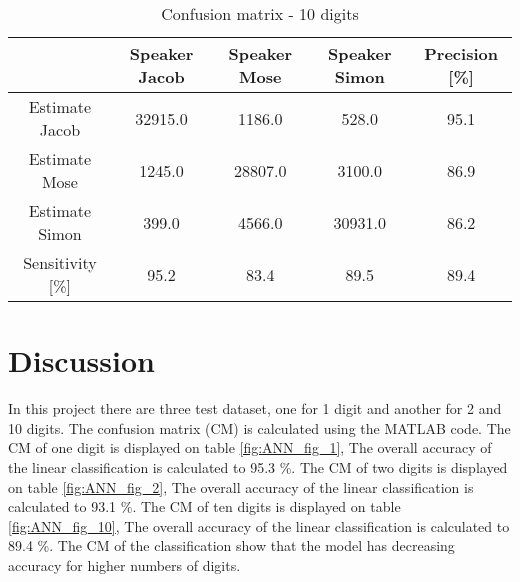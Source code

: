\begin{table}[H]                                                    
\centering                                                          
\begin{tabular}{|c|c|c|c|c|}                                        
\hline                                                              
  & Speaker Jacob & Speaker Mose & Speaker Simon & Precision [\%] \\
\hline                                                              
Estimate Jacob & 32915.0 & 1186.0 & 528.0 & 95.1 \\                 
\hline                                                              
Estimate Mose & 1245.0 & 28807.0 & 3100.0 & 86.9 \\                 
\hline                                                              
Estimate Simon & 399.0 & 4566.0 & 30931.0 & 86.2 \\                 
\hline                                                              
Sensitivity [\%] & 95.2 & 83.4 & 89.5 & 89.4 \\                     
\hline                                                              
\end{tabular}                                                       
\caption{Confusion matrix - 10 digits}                              
\label{table:ANN_conf_10}                                           
\end{table}


\section{Discussion}
In this project there are three test dataset, one for 1 digit and another for 2 and 10 digits.
The confusion matrix (CM) is calculated using the MATLAB code. 
The CM of one digit is displayed on table \ref{fig:ANN_fig_1}, The overall accuracy of the linear classification is  calculated to 95.3 \%.
The CM of two digits is displayed on table \ref{fig:ANN_fig_2}, The overall accuracy of the linear classification is  calculated to 93.1 \%.
The CM of ten digits is displayed on table \ref{fig:ANN_fig_10}, The overall accuracy of the linear classification is  calculated to 89.4 \%.
The CM of the classification show that the model has decreasing accuracy for higher numbers of digits.
